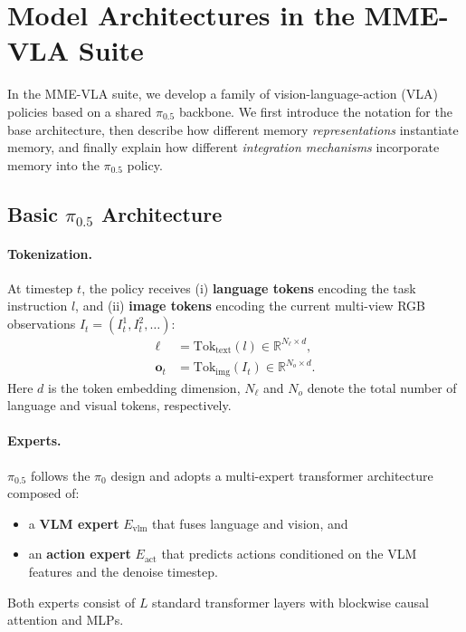 \clearpage
\section{Model Architectures in the MME-VLA Suite}
\label{sec:appx_model_design}

In the MME-VLA suite, we develop a family of vision-language-action (VLA) policies based on a shared $\pi_{0.5}$ backbone. We first introduce the notation for the base architecture, then describe how different memory \emph{representations} instantiate memory, and finally explain how different \emph{integration mechanisms} incorporate memory into the $\pi_{0.5}$ policy.


\subsection{Basic $\pi_{0.5}$ Architecture}
\label{sec:pi05}
\paragraph{Tokenization.}
At timestep $t$, the policy receives
(i) \textbf{language tokens} encoding the task instruction $l$, and
(ii) \textbf{image tokens} encoding the current multi-view RGB observations
$I_t=(I^{1}_t,I^{2}_t,\dots)$:
\begin{align}
\boldsymbol{\ell} &= \mathrm{Tok}_{\text{text}}(l) \in \mathbb{R}^{N_\ell \times d}, \\
\mathbf{o}_t &= \mathrm{Tok}_{\text{img}}(I_t) \in \mathbb{R}^{N_o \times d}.
\end{align}
Here $d$ is the token embedding dimension, $N_\ell$ and $N_o$ denote the total number of language and visual tokens, respectively. 

\paragraph{Experts.}
$\pi_{0.5}$ \cite{pi05} follows the $\pi_{0}$ design \cite{pi0} and adopts a multi-expert transformer architecture composed of:
\begin{itemize}
\item a \textbf{VLM expert} $E_{\text{vlm}}$ that fuses language and vision, and
\item an \textbf{action expert} $E_{\text{act}}$ that predicts actions conditioned on the VLM features and the denoise timestep.
\end{itemize}
Both experts consist of $L$ standard transformer layers with blockwise causal attention and MLPs.


